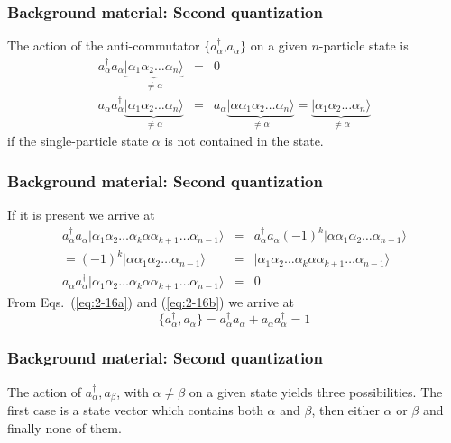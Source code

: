 \documentclass[compress]{beamer}
\newcommand*{\ket}[1]{|#1\rangle}
\begin{document}
\frame
{
  \frametitle{Background material: Second quantization}
\begin{small}
{\scriptsize
The action of the anti-commutator 
$\{a_\alpha^\dagger$,$a_\alpha\}$ on a given $n$-particle state is
\begin{eqnarray}
	a_\alpha^\dagger a_\alpha \underbrace{\ket{\alpha_1\alpha_2 \dots \alpha_{n}}}_{\neq \alpha} &=& 0 \nonumber \\
	a_\alpha a_\alpha^\dagger \underbrace{\ket{\alpha_1\alpha_2 \dots \alpha_{n}}}_{\neq \alpha} &=&
	a_\alpha \underbrace{\ket{\alpha \alpha_1\alpha_2 \dots \alpha_{n}}}_{\neq \alpha} = 
	\underbrace{\ket{\alpha_1\alpha_2 \dots \alpha_{n}}}_{\neq \alpha} \label{eq:2-16a}
\end{eqnarray}
if the single-particle state $\alpha$ is not contained in the state.
}
\end{small}
}
\frame
{
  \frametitle{Background material: Second quantization}
\begin{small}
{\scriptsize
 If it is present
we arrive at
\begin{eqnarray}
	a_\alpha^\dagger a_\alpha \ket{\alpha_1\alpha_2 \dots \alpha_{k}\alpha \alpha_{k+1} \dots \alpha_{n-1}} &=&
	a_\alpha^\dagger a_\alpha (-1)^k \ket{\alpha \alpha_1\alpha_2 \dots \alpha_{n-1}} \nonumber \\
	= (-1)^k \ket{\alpha \alpha_1\alpha_2 \dots \alpha_{n-1}} &=& 
	\ket{\alpha_1\alpha_2 \dots \alpha_{k}\alpha \alpha_{k+1} \dots \alpha_{n-1}} \nonumber \\
	a_\alpha a_\alpha^\dagger\ket{\alpha_1\alpha_2 \dots \alpha_{k}\alpha \alpha_{k+1} \dots \alpha_{n-1}} &=& 0 \label{eq:2-16b}
\end{eqnarray}
From Eqs.~(\ref{eq:2-16a}) and  (\ref{eq:2-16b}) we arrive at 
\begin{equation}
	\{a_\alpha^\dagger , a_\alpha \} = a_\alpha^\dagger a_\alpha + a_\alpha a_\alpha^\dagger = 1 \label{eq:2-17}
\end{equation}
}
\end{small}
}
\frame
{
  \frametitle{Background material: Second quantization}
\begin{small}
{\scriptsize
The action of ${a_\alpha^\dagger, a_\beta}$, with 
$\alpha \ne \beta$ on a given state yields three possibilities. 
The first case is a state vector which contains both $\alpha$ and $\beta$, then either 
$\alpha$ or $\beta$ and finally none of them.
}
\end{small}
}
\frame
\end{document}
